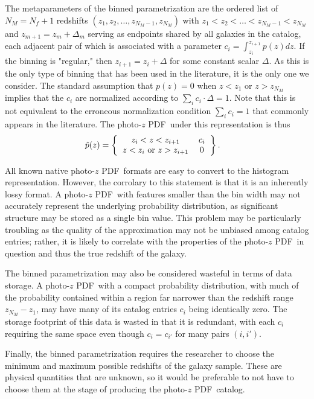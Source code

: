 \documentclass[\docopts]{\docclass}
\newcommand{\pz}{photo-$z$ PDF}
\begin{document}
The metaparameters of the binned parametrization are the ordered list of 
$N_{M}=N_{f}+1$ redshifts $(z_{1}, z_{2}, \dots, z_{N_{M}-1}, z_{N_{M}})$ with 
$z_{1} < z_{2} < \dots < z_{N_{M}-1} < z_{N_{M}}$ and 
$z_{m+1}=z_{m}+\Delta_{m}$ serving as endpoints shared by all galaxies in the 
catalog, each adjacent pair of which is associated with a parameter 
$c_{i}=\int_{z_{i}}^{z_{i+1}}p(z)dz$.  If the binning is "regular," then 
$z_{i+1}=z_{i}+\Delta$ for some constant scalar $\Delta$.  As this is the only 
type of binning that has been used in the literature, it is the only one we 
consider.  The standard assumption that $p(z)=0$ when $z<z_{1}$ or 
$z>z_{N_{M}}$ implies that the $c_{i}$ are normalized according to $\sum_{i} 
c_{i}\cdot\Delta = 1$.  Note that this is not equivalent to the erroneous 
normalization condition $\sum_{i} c_{i} = 1$ that commonly appears in the 
literature.  The \pz\ under this representation is thus
\begin{align}
  \label{eq:bin_interpolated}
  \hat{p}(z) &= \left\{\begin{tabular}{cc}$z_{i}<z<z_{i+1}$&$c_{i}$\\
$z < z_{i}$\ or\ $z > z_{i+1}$&$0$\end{tabular}\right\}.
\end{align}

All known native \pz\ formats are easy to convert to the histogram 
representation.  However, the corrolary to this statement is that it is an 
inherently lossy format.  A \pz\ with features smaller than the bin width may 
not accurately represent the underlying probability distribution, as 
significant structure may be stored as a single bin value.  This problem may be 
particularly troubling as the quality of the approximation may not be unbiased 
among catalog entries; rather, it is likely to correlate with the properties of 
the \pz\ in question and thus the true redshift of the galaxy.

The binned parametrization may also be considered wasteful in terms of data 
storage.  A \pz\ with a compact probability distribution, with much of the 
probability contained within a region far narrower than the redshift range 
$z_{N_{M}} - z_{1}$, may have many of its catalog entries $c_{i}$ being 
identically zero.  The storage footprint of this data is wasted in that it is 
redundant, with each $c_{i}$ requiring the same space even though 
$c_{i}=c_{i'}$ for many pairs $(i, i')$.

Finally, the binned parametrization requires the researcher to choose the 
minimum and maximum possible redshifts of the galaxy sample.  These are 
physical quantities that are unknown, so it would be preferable to not have to 
choose them at the stage of producing the \pz\ catalog.
\end{document}
